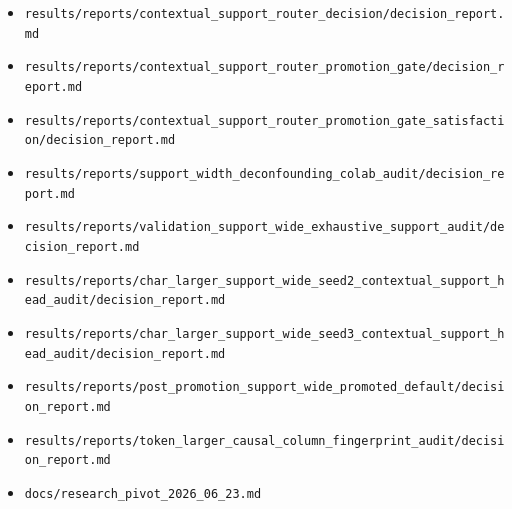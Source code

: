 \documentclass[11pt]{article}
\begin{document}
\begin{itemize}
  \item \texttt{results/reports/contextual\_support\_router\_decision/decision\_report.md}
  \item \texttt{results/reports/contextual\_support\_router\_promotion\_gate/decision\_report.md}
  \item \texttt{results/reports/contextual\_support\_router\_promotion\_gate\_satisfaction/decision\_report.md}
  \item \texttt{results/reports/support\_width\_deconfounding\_colab\_audit/decision\_report.md}
  \item \texttt{results/reports/validation\_support\_wide\_exhaustive\_support\_audit/decision\_report.md}
  \item \texttt{results/reports/char\_larger\_support\_wide\_seed2\_contextual\_support\_head\_audit/decision\_report.md}
  \item \texttt{results/reports/char\_larger\_support\_wide\_seed3\_contextual\_support\_head\_audit/decision\_report.md}
  \item \texttt{results/reports/post\_promotion\_support\_wide\_promoted\_default/decision\_report.md}
  \item \texttt{results/reports/token\_larger\_causal\_column\_fingerprint\_audit/decision\_report.md}
  \item \texttt{docs/research\_pivot\_2026\_06\_23.md}
\end{itemize}
\end{document}
